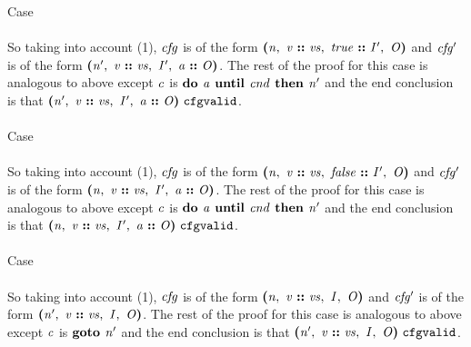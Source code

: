 \documentclass[12pt]{article}
\begin{document}
Case
\\
\\

So taking into account (1), $\mathit{cfg}$ is of the form
$\textbf{(}\mathit{n},\ \mathit{v}\ \textbf{::}\ \mathit{vs},\ \mathit{true}\ \textbf{::}\ \mathit{I'},\ \mathit{O}\textbf{)}$
and $\mathit{cfg'}$ is of the form
$\textbf{(}\mathit{n'},\ \mathit{v}\ \textbf{::}\ \mathit{vs},\ \mathit{I'},\ \mathit{a}\ \textbf{::}\ \mathit{O}\textbf{)}$.
The rest of the proof for this case is analogous to above except $\mathit{c}$ is
$\textbf{do }\mathit{a}\textbf{ until }\mathit{cnd}\textbf{ then }\mathit{n'}$ and the end conclusion is that
$\textbf{(}\mathit{n'},\ \mathit{v}\ \textbf{::}\ \mathit{vs},\ \mathit{I'},\ \mathit{a}\ \textbf{::}\ \mathit{O}\textbf{)}\ \mathtt{cfgvalid}$.\\
\\

Case
\\
\\

So taking into account (1), $\mathit{cfg}$ is of the form
$\textbf{(}\mathit{n},\ \mathit{v}\ \textbf{::}\ \mathit{vs},\ \mathit{false}\ \textbf{::}\ \mathit{I'},\ \mathit{O}\textbf{)}$
and $\mathit{cfg'}$ is of the form
$\textbf{(}\mathit{n},\ \mathit{v}\ \textbf{::}\ \mathit{vs},\ \mathit{I'},\ \mathit{a}\ \textbf{::}\ \mathit{O}\textbf{)}$.
The rest of the proof for this case is analogous to above except $\mathit{c}$ is
$\textbf{do }\mathit{a}\textbf{ until }\mathit{cnd}\textbf{ then }\mathit{n'}$ and the end conclusion is that
$\textbf{(}\mathit{n},\ \mathit{v}\ \textbf{::}\ \mathit{vs},\ \mathit{I'},\ \mathit{a}\ \textbf{::}\ \mathit{O}\textbf{)}\ \mathtt{cfgvalid}$.\\
\\

Case
\\
\\

So taking into account (1), $\mathit{cfg}$ is of the form
$\textbf{(}\mathit{n},\ \mathit{v}\ \textbf{::}\ \mathit{vs},\ \mathit{I},\ \mathit{O}\textbf{)}$
and $\mathit{cfg'}$ is of the form
$\textbf{(}\mathit{n'},\ \mathit{v}\ \textbf{::}\ \mathit{vs},\ \mathit{I},\ \mathit{O}\textbf{)}$.
The rest of the proof for this case is analogous to above except $\mathit{c}$ is
$\textbf{goto }\mathit{n'}$ and the end conclusion is that
$\textbf{(}\mathit{n'},\ \mathit{v}\ \textbf{::}\ \mathit{vs},\ \mathit{I},\ \mathit{O}\textbf{)}\ \mathtt{cfgvalid}$.\\
\\
\end{document}
